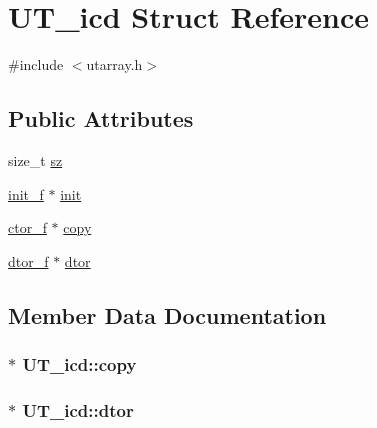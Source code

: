 \hypertarget{struct_u_t__icd}{}\section{U\+T\+\_\+icd Struct Reference}
\label{struct_u_t__icd}


{\ttfamily \#include $<$utarray.\+h$>$}

\subsection*{Public Attributes}
\begin{DoxyCompactItemize}
\item 
size\+\_\+t \hyperlink{struct_u_t__icd_a7021fa86e4197995817c9682140c2c82}{sz}
\item 
\hyperlink{utarray_8h_a4e45ad944e4b090436906f9e4650113c}{init\+\_\+f} $\ast$ \hyperlink{struct_u_t__icd_a4efb7d75484d26a649038a991329cfd1}{init}
\item 
\hyperlink{utarray_8h_a39f9285348c36c106a8407584519727a}{ctor\+\_\+f} $\ast$ \hyperlink{struct_u_t__icd_af58b65eb0c3c21a99dc31c61f996408b}{copy}
\item 
\hyperlink{utarray_8h_aba771aa4943a8d7f336e733cf105bfb4}{dtor\+\_\+f} $\ast$ \hyperlink{struct_u_t__icd_ab1e1f6d1a48da57ff8e42b267dccedab}{dtor}
\end{DoxyCompactItemize}


\subsection{Member Data Documentation}
\subsubsection[{\texorpdfstring{copy}{copy}}]{$\ast$ U\+T\+\_\+icd\+::copy}\hypertarget{struct_u_t__icd_af58b65eb0c3c21a99dc31c61f996408b}{}\label{struct_u_t__icd_af58b65eb0c3c21a99dc31c61f996408b}
\subsubsection[{\texorpdfstring{dtor}{dtor}}]{$\ast$ U\+T\+\_\+icd\+::dtor}\hypertarget{struct_u_t__icd_ab1e1f6d1a48da57ff8e42b267dccedab}{}\label{struct_u_t__icd_ab1e1f6d1a48da57ff8e42b267dccedab}
